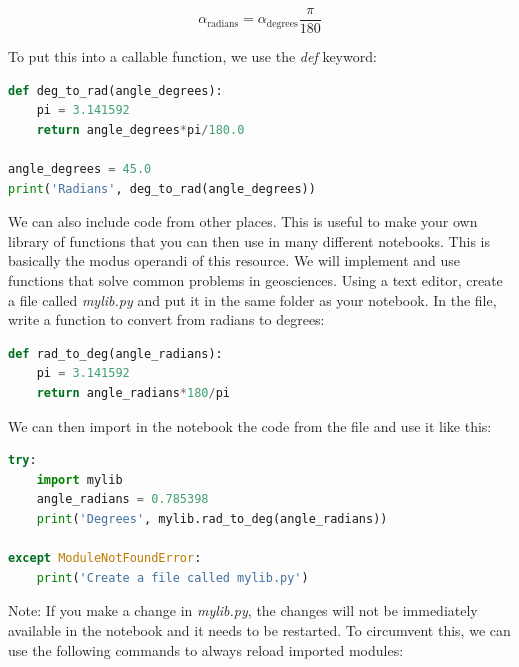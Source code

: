 \documentclass[a4paper , 12pt]{book}
\begin{document}
\begin{equation}
    \alpha_\text{radians} = \alpha_\text{degrees}\frac{\pi}{180}
\end{equation}    

To put this into a callable function, we use the \textit{def} keyword:

\begin{center}
\begin {lstlisting}[language=Python, frame=single]
def deg_to_rad(angle_degrees):
    pi = 3.141592
    return angle_degrees*pi/180.0

angle_degrees = 45.0
print('Radians', deg_to_rad(angle_degrees))
\end{lstlisting}
\end{center}

We can also include code from other places. This is useful to make your own library of functions that you can then use in many different notebooks. This is basically the modus operandi of this resource. We will implement and use functions that solve common problems in geosciences. Using a text editor, create a file called \textit{mylib.py} and put it in the same folder as your notebook. In the file, write a function to convert from radians to degrees:

\begin{center}
\begin{lstlisting}[language=Python, frame=single]
def rad_to_deg(angle_radians):
    pi = 3.141592
    return angle_radians*180/pi
\end{lstlisting}
\end{center}

We can then import in the notebook the code from the file and use it like this:

\begin{center}
\begin{lstlisting}[language=Python, frame=single]
try:
    import mylib
    angle_radians = 0.785398
    print('Degrees', mylib.rad_to_deg(angle_radians))
    
except ModuleNotFoundError:
    print('Create a file called mylib.py')
\end{lstlisting}
\end{center}

Note: If you make a change in \textit{mylib.py}, the changes will not be immediately available in the notebook and it needs to be restarted. To circumvent this, we can use the following commands to always reload imported modules:
\end{document}
